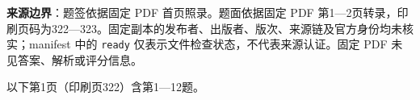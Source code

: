 

\begin{gktip}
\textbf{来源边界}：题签依据固定 PDF 首页照录。题面依据固定 PDF 第1—2页转录，印刷页码为322—323。固定副本的发布者、出版者、版次、来源链及官方身份均未核实；manifest 中的 \texttt{ready} 仅表示文件检查状态，不代表来源认证。固定 PDF 未见答案、解析或评分信息。
\end{gktip}


\begin{gktip}
以下第1页（印刷页322）含第1—12题。
\end{gktip}

